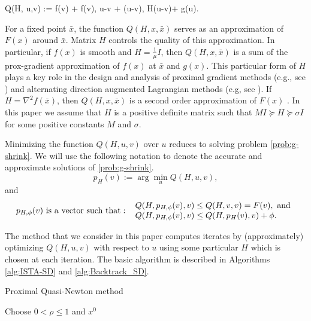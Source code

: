 \documentclass[11pt]{article}
\numberwithin{equation}{section}
\begin{document}
\bea \label{def-Qf}
Q(H, u,v) := f(v) +
\langle \nabla f(v),  u-v \rangle +  \langle (u-v), H(u-v)\rangle + g(u).
\eea 


%
For a fixed point $\bar x$, the function $Q(H,  x, \bar x)$ serves as an approximation of $F(x)$ around  $\bar x$. 
Matrix $H$ controls the quality of this approximation. In particular, if $f(x)$ is smooth  and  $H=\frac{1}{\mu}I$, then $Q(H, x , \bar x)$ is a sum of the prox-gradient approximation of $f(x)$ at $\bar x$ and $g(x)$. This particular form of $H$ plays a key role in the design and analysis of proximal gradient methods (e.g., see  \cite{Beck2009}) 
and alternating direction augmented Lagrangian methods (e.g, see \cite{Alm_Scheinberg}).
 If  $H=\nabla^2 f(\bar x)$, then  $Q(H, x ,\bar x)$
is a second order approximation of $F(x)$  \cite{Saundersetal, SchmidtQP}.
In this paper we assume that  $H$ is a positive definite matrix such that $M I \succeq H\succeq \sigma I$ for some positive constants $M$ and $\sigma$. 

Minimizing the function $Q(H, u,v)$ over $u$ reduces to solving problem \eqref{prob:g-shrink}. We will use the following notation to denote the accurate and approximate solutions of \eqref{prob:g-shrink}.
\begin{equation}\label{eq:pv}
p_H(v):=\arg\min_u Q(H, u,v),  
\end{equation}
and 
\begin{equation}\label{eq:pvphi}
p_{H, \phi}(v) {\rm \ is \ a\ vector\ such\ that:\ } \  \begin{array}{l}  Q(H, p_{H, \phi}(v),v)\leq Q(H, v,v)=F(v),\ {\rm and }\\
Q(H, p_{H, \phi}(v),v)\leq Q(H, p_{H}(v),v)+\phi. \end{array}
\end{equation}

The method that we consider in this paper computes iterates by (approximately) optimizing $Q(H, u,v)$ with respect to $u$ using some particular  $H$  which is chosen at each iteration.
 The basic algorithm is described in Algorithms \ref{alg:ISTA-SD} and \ref{alg:Backtrack_SD}. 
\begin{algorithm2e}\caption{Proximal Quasi-Newton method}
    \label{alg:ISTA-SD}%
{\rm Choose }
$0<\rho\leq 1$ and  $x^0$\; 
\end{algorithm2e}
\end{document}
